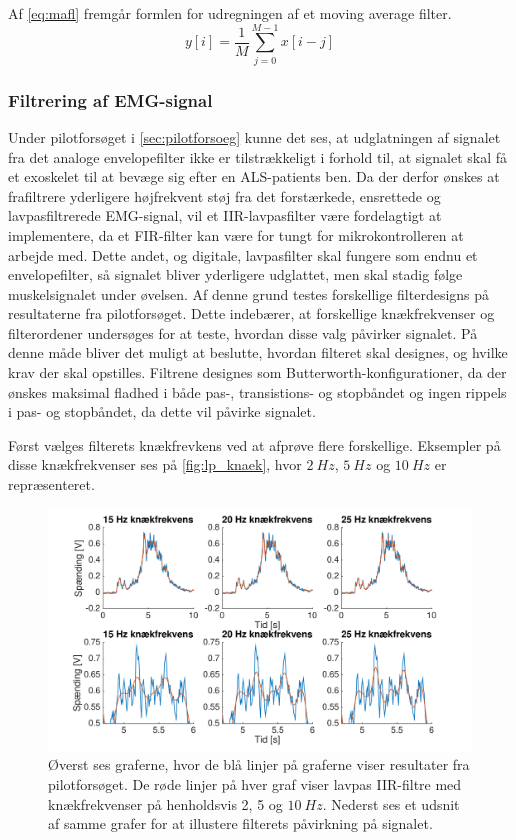 \noindent
Af \autoref{eq:mafl} fremgår formlen for udregningen af et moving average filter. 
\begin{equation}
	y[i]=\dfrac{1}{M}\sum^{M-1}_{j=0} x[i-j]
\label{eq:mafl}
\end{equation}

\subsubsection{Filtrering af EMG-signal} \label{sec:lavpas_krav}
Under pilotforsøget i \autoref{sec:pilotforsoeg} kunne det ses, at udglatningen af signalet fra det analoge envelopefilter ikke er tilstrækkeligt i forhold til, at signalet skal få et exoskelet til at bevæge sig efter en ALS-patients ben. Da der derfor ønskes at frafiltrere yderligere højfrekvent støj fra det forstærkede, ensrettede og lavpasfiltrerede EMG-signal, vil et IIR-lavpasfilter være fordelagtigt at implementere, da et FIR-filter kan være for tungt for mikrokontrolleren at arbejde med. Dette andet, og digitale, lavpasfilter skal fungere som endnu et envelopefilter, så signalet bliver yderligere udglattet, men skal stadig følge muskelsignalet under øvelsen.
Af denne grund testes forskellige filterdesigns på resultaterne fra pilotforsøget. Dette indebærer, at forskellige knækfrekvenser og filterordener undersøges for at teste, hvordan disse valg påvirker signalet. På denne måde bliver det muligt at beslutte, hvordan filteret skal designes, og hvilke krav der skal opstilles. Filtrene designes som Butterworth-konfigurationer, da der ønskes maksimal fladhed i både pas-, transistions- og stopbåndet og ingen rippels i pas- og stopbåndet, da dette vil påvirke signalet.

Først vælges filterets knækfrevkens ved at afprøve flere forskellige. Eksempler på disse knækfrekvenser ses på \autoref{fig:lp_knaek}, hvor $2~Hz$, $5~Hz$ og $10~Hz$ er repræsenteret. 

\begin{figure} [H]
\centering
\includegraphics[width=1.0\textwidth]{figures/problemloesning/lavpas_knaek.pdf}
\caption{Øverst ses graferne, hvor de blå linjer på graferne viser resultater fra pilotforsøget. De røde linjer på hver graf viser lavpas IIR-filtre med knækfrekvenser på henholdsvis 2, 5 og $10~Hz$. Nederst ses et udsnit af samme grafer for at illustere filterets påvirkning på signalet.}
\label{fig:lp_knaek}
\end{figure} 

